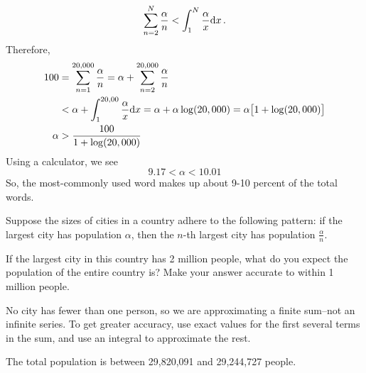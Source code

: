 \begin{solution}
	\[ \sum_{n=2}^N \frac{\alpha}{n}< \int_1^{N} \frac{\alpha}{x}\mathrm{d}x\,.\]
	Therefore,
	\begin{align*}
	100&= \sum_{n=1}^{20,000} \frac{\alpha}{n}= \alpha+\sum_{n=2}^{20,000} \frac{\alpha}{n}\\
	&<\alpha+\int_1^{20,00} \frac{\alpha}{x}\mathrm{d}x=\alpha+\alpha\log(20,000)=\alpha\big[1+\log(20,000)\big]\\
	\alpha&>\frac{100}{1+\log(20,000)}
	\end{align*}
	Using a calculator, we see
	\[9.17 < \alpha < 10.01\]
	So, the most-commonly used word makes up about 9-10 percent of the total words.
\end{solution}


\begin{question}\label{probs3.2_Zipf2}

	Suppose the sizes of cities in a country adhere to the following pattern: if the largest city has population $\alpha$, then the $n$-th largest city has population $\frac{\alpha}{n}$.

	If the largest city in this country has 2 million people, what do you expect the population of the entire country is? Make your answer accurate to within 1 million people.

\end{question}
\begin{hint}
	No city has fewer than one person, so we are approximating a finite sum--not an infinite series. To get greater accuracy, use exact values for the first several terms in the sum, and use an integral to approximate the rest.
\end{hint}
\begin{answer}
	The total population is between 29,820,091 and 29,244,727 people.
\end{answer}

